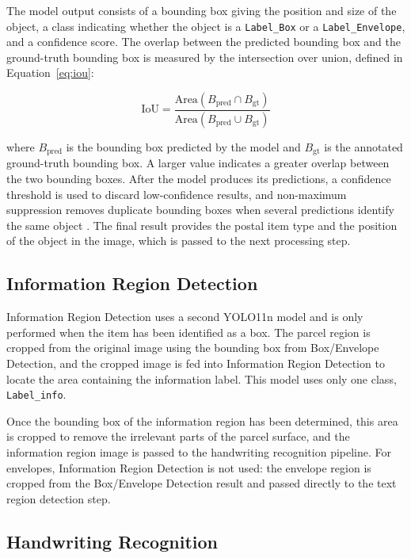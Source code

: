 The model output consists of a bounding box giving the position and size of the object, a class indicating whether the object is a \texttt{Label\_Box} or a \texttt{Label\_Envelope}, and a confidence score. The overlap between the predicted bounding box and the ground-truth bounding box is measured by the intersection over union, defined in Equation~\eqref{eq:iou}:

\begin{equation}
\label{eq:iou}
\mathrm{IoU} = \frac{\mathrm{Area}\left(B_{\mathrm{pred}} \cap B_{\mathrm{gt}}\right)}{\mathrm{Area}\left(B_{\mathrm{pred}} \cup B_{\mathrm{gt}}\right)}
\end{equation}

where $B_{\mathrm{pred}}$ is the bounding box predicted by the model and $B_{\mathrm{gt}}$ is the annotated ground-truth bounding box. A larger value indicates a greater overlap between the two bounding boxes. After the model produces its predictions, a confidence threshold is used to discard low-confidence results, and non-maximum suppression removes duplicate bounding boxes when several predictions identify the same object \cite{ultralytics_yolo11}. The final result provides the postal item type and the position of the object in the image, which is passed to the next processing step.

\subsection{Information Region Detection}

Information Region Detection uses a second YOLO11n model and is only performed when the item has been identified as a box. The parcel region is cropped from the original image using the bounding box from Box/Envelope Detection, and the cropped image is fed into Information Region Detection to locate the area containing the information label. This model uses only one class, \texttt{Label\_info}.

Once the bounding box of the information region has been determined, this area is cropped to remove the irrelevant parts of the parcel surface, and the information region image is passed to the handwriting recognition pipeline. For envelopes, Information Region Detection is not used: the envelope region is cropped from the Box/Envelope Detection result and passed directly to the text region detection step.

\subsection{Handwriting Recognition}

